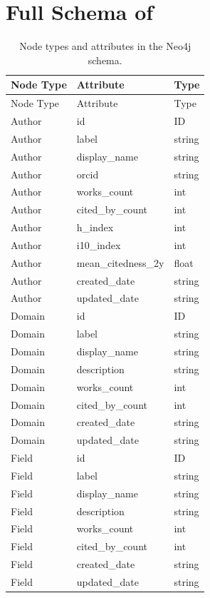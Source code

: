 \section{Full Schema of {\ours}}
\label{app:schema}
\begin{longtable}{p{2.8cm}p{5.5cm}p{3cm}}
\caption{Node types and attributes in the Neo4j schema.}
\label{tab:node-attributes} \\

\toprule
Node Type & Attribute & Type \\
\midrule
\endfirsthead

\toprule
Node Type & Attribute & Type \\
\midrule
\endhead

\bottomrule
\endfoot

Author & id & ID \\
Author & label & string \\
Author & display\_name & string \\
Author & orcid & string \\
Author & works\_count & int \\
Author & cited\_by\_count & int \\
Author & h\_index & int \\
Author & i10\_index & int \\
Author & mean\_citedness\_2y & float \\
Author & created\_date & string \\
Author & updated\_date & string \\

Domain & id & ID \\
Domain & label & string \\
Domain & display\_name & string \\
Domain & description & string \\
Domain & works\_count & int \\
Domain & cited\_by\_count & int \\
Domain & created\_date & string \\
Domain & updated\_date & string \\

Field & id & ID \\
Field & label & string \\
Field & display\_name & string \\
Field & description & string \\
Field & works\_count & int \\
Field & cited\_by\_count & int \\
Field & created\_date & string \\
Field & updated\_date & string \\


\end{longtable}
